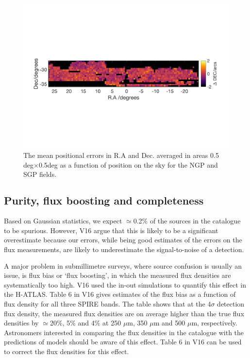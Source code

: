 \documentclass[a4paper,fleqn,usenatbib, twocolumn]{aastex61}
\begin{document}
\begin{figure}
\includegraphics[scale=0.6,trim={0 60mm 0mm 80mm}, clip]{sgp_ddec.png}
\caption{\protect\label{fig_pos_errs} The mean positional errors in
  R.A and Dec. averaged in areas 0.5 deg$\times$0.5deg as a
  function of position on the sky for the NGP and SGP
  fields. 
}
\end{figure} 

\subsection{Purity, flux boosting and completeness}

Based on Gaussian statistics, we expect $\simeq$0.2\% of the sources
in the catalogue to be spurious. However, V16 argue that this is
likely to be a significant overestimate because our errors, while
being good estimates of the errors on the flux measurements, are
likely to underestimate the signal-to-noise of a detection.

A major problem in submillimetre surveys, where source confusion is
usually an issue, is flux bias or `flux boosting', in which the
measured flux densities are systematically too high. V16 used the
in-out simulations to quantify this effect in the H-ATLAS. Table 6 in
V16 gives estimates of the flux bias as a function of flux density for
all three SPIRE bands. The table shows that at the 4$\sigma$ detection
flux density, the measured flux densities are on average higher than
the true flux densities by $\simeq$20\%, 5\% and 4\% at 250 $\mu$m,
350 $\mu$m and 500 $\mu$m, respectively. Astronomers interested in
comparing the flux densities in the catalogue with the predictions of
models should be aware of this effect. Table 6 in V16 can be used to
correct the flux densities for this effect.
\end{document}
